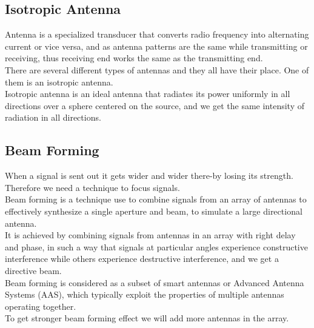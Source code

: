 \subsection{Isotropic Antenna}
Antenna is a specialized transducer that converts radio frequency into alternating current or vice versa, and as antenna patterns are the same while transmitting or receiving, thus receiving end works the same as the transmitting end.\\
There are several different types of antennas and they all have their place. One of them is an isotropic antenna.\\
Isotropic antenna is an ideal antenna that radiates its power uniformly in all directions over a sphere centered on the source, and we get the same intensity of radiation in all directions.

\subsection{Beam Forming}
When a signal is sent out it gets wider and wider there-by losing its strength. Therefore we need a technique to focus signals.\\
Beam forming is a technique use to combine signals from an array of antennas to effectively synthesize a single aperture and beam, to simulate a large directional antenna.\\
It is achieved by combining signals from antennas in an array with right delay and phase, in such a way that signals at particular angles experience constructive interference while others experience destructive interference, and we get a directive beam.\\
Beam forming is considered as a subset of smart antennas or Advanced Antenna Systems (AAS), which typically exploit the properties of multiple antennas operating together.\\
To get stronger beam forming effect we will add more antennas in the array.

